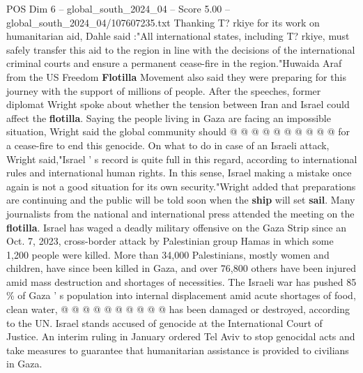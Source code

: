 \begin{textsample}{POS Dim 6 – global\_south\_2024\_04 – Score 5.00 – global\_south\_2024\_04/107607235.txt}
Thanking T? rkiye for its work on humanitarian aid, Dahle said :"All international states, including T? rkiye, must safely transfer this aid to the region in line with the decisions of the international criminal courts and ensure a permanent cease-fire in the region."Huwaida Araf from the US Freedom \textbf{Flotilla} Movement also said they were preparing for this journey with the support of millions of people.
After the speeches, former diplomat Wright spoke about whether the tension between Iran and Israel could affect the \textbf{flotilla}.
Saying the people living in Gaza are facing an impossible situation, Wright said the global community should @ @ @ @ @ @ @ @ @ @ for a cease-fire to end this genocide.
On what to do in case of an Israeli attack, Wright said,"Israel ' s record is quite full in this regard, according to international rules and international human rights.
In this sense, Israel making a mistake once again is not a good situation for its own security."Wright added that preparations are continuing and the public will be told soon when the \textbf{ship} will set \textbf{sail}.
Many journalists from the national and international press attended the meeting on the \textbf{flotilla}.
Israel has waged a deadly military offensive on the Gaza Strip since an Oct. 7, 2023, cross-border attack by Palestinian group Hamas in which some 1,200 people were killed.
More than 34,000 Palestinians, mostly women and children, have since been killed in Gaza, and over 76,800 others have been injured amid mass destruction and shortages of necessities.
The Israeli war has pushed 85 \% of Gaza ' s population into internal displacement amid acute shortages of food, clean water, @ @ @ @ @ @ @ @ @ @ has been damaged or destroyed, according to the UN.
Israel stands accused of genocide at the International Court of Justice.
An interim ruling in January ordered Tel Aviv to stop genocidal acts and take measures to guarantee that humanitarian assistance is provided to civilians in Gaza.

\end{textsample}
